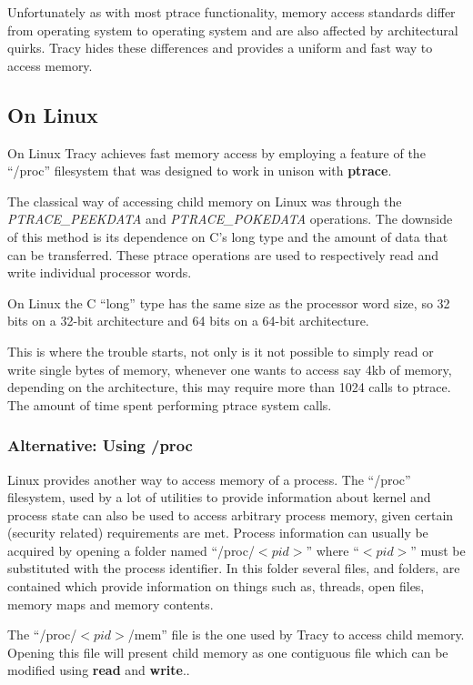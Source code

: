 \documentclass[a4paper, 10pt]{report}
\begin{document}
Unfortunately as with most ptrace functionality, memory access standards
differ from operating system to operating system and are also
affected by architectural quirks. Tracy hides these differences and
provides a uniform and fast way to access memory.

\subsection{On Linux}
On Linux Tracy achieves fast memory access by employing a feature of the
``/proc'' filesystem that was designed to work in unison with
\textbf{ptrace}.

The classical way of accessing child memory on Linux was through the
\textit{PTRACE\_PEEKDATA} and \textit{PTRACE\_POKEDATA} operations.
The downside of this method is its dependence on C's long type and the
amount of data that can be transferred.
These ptrace operations are used to respectively read and write individual
processor words.

On Linux the C ``long'' type has the same size as the
processor word size, so 32 bits on a 32-bit architecture and
64 bits on a 64-bit architecture.

This is where the trouble starts, not only is it not possible to simply read
or write single bytes of memory, whenever one wants to access say 4kb of
memory, depending on the architecture, this may require more than 1024
calls to ptrace. The amount of time spent performing ptrace system calls.

\subsubsection{Alternative: Using /proc}
Linux provides another way to access memory of a process. The ``/proc''
filesystem, used by a lot of utilities to provide information about kernel
and process state can also be used to access arbitrary process memory,
given certain (security related) requirements are met.
Process information can usually be acquired by opening a folder
named ``/proc/$<pid>$'' where ``$<pid>$'' must be substituted with the process
identifier. In this folder several files, and folders, are contained which
provide information on things such as, threads, open files, memory maps and
memory contents.

The ``/proc/$<pid>$/mem'' file is the one used by Tracy to access child memory.
Opening this file will present child memory as one contiguous file which
can be modified using \textbf{read} and \textbf{write}..
\end{document}
